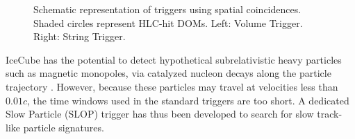 \begin{figure}[ht]
  \centering {}
  \quad
  \caption{Schematic representation of triggers using spatial coincidences.  Shaded circles
    represent HLC-hit DOMs.  Left: Volume Trigger.  Right: String Trigger. }
\end{figure}

IceCube has the potential to detect hypothetical subrelativistic heavy
particles such as magnetic monopoles, via catalyzed nucleon decays along
the particle trajectory \cite{Aartsen:2014awd}.  However, because these
particles may travel at velocities less than $0.01c$, the time
windows used in the standard triggers are too short.  A dedicated Slow
Particle (SLOP) trigger has thus been developed to search for slow
track-like particle signatures.

